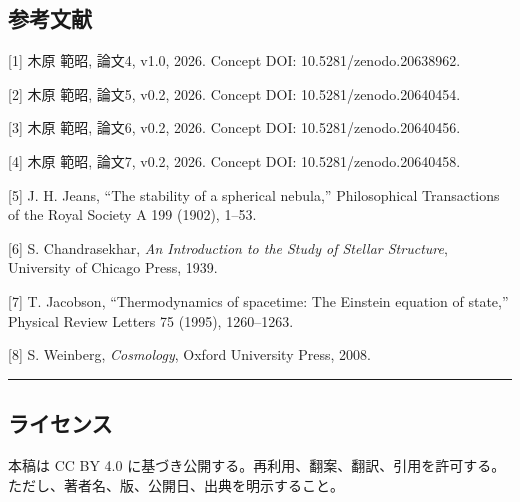 \documentclass[
]{ltjsarticle}
\begin{document}
\subsection{参考文献}\label{ux53c2ux8003ux6587ux732e}

{[}1{]} 木原 範昭, 論文4, v1.0, 2026. Concept DOI:
10.5281/zenodo.20638962.

{[}2{]} 木原 範昭, 論文5, v0.2, 2026. Concept DOI: 10.5281/zenodo.20640454.

{[}3{]} 木原 範昭, 論文6, v0.2, 2026. Concept DOI: 10.5281/zenodo.20640456.

{[}4{]} 木原 範昭, 論文7, v0.2, 2026. Concept DOI: 10.5281/zenodo.20640458.

{[}5{]} J. H. Jeans, ``The stability of a spherical nebula,''
Philosophical Transactions of the Royal Society A 199 (1902), 1--53.

{[}6{]} S. Chandrasekhar, \emph{An Introduction to the Study of Stellar
Structure}, University of Chicago Press, 1939.

{[}7{]} T. Jacobson, ``Thermodynamics of spacetime: The Einstein
equation of state,'' Physical Review Letters 75 (1995), 1260--1263.

{[}8{]} S. Weinberg, \emph{Cosmology}, Oxford University Press, 2008.

\begin{center}\rule{0.5\linewidth}{0.5pt}\end{center}

\subsection{ライセンス}\label{ux30e9ux30a4ux30bbux30f3ux30b9}

本稿は CC BY 4.0
に基づき公開する。再利用、翻案、翻訳、引用を許可する。ただし、著者名、版、公開日、出典を明示すること。
\end{document}
